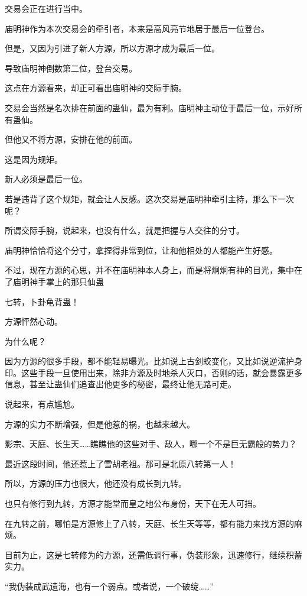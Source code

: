 
\begin{this_body}

交易会正在进行当中。

庙明神作为本次交易会的牵引者，本来是高风亮节地居于最后一位登台。

但是，又因为引进了新人方源，所以方源才成为最后一位。

导致庙明神倒数第二位，登台交易。

这点在方源看来，却正可看出庙明神的交际手腕。

交易会当然是名次排在前面的蛊仙，最为有利。庙明神主动位于最后一位，示好所有蛊仙。

但他又不将方源，安排在他的前面。

这是因为规矩。

新人必须是最后一位。

若是违背了这个规矩，就会让人反感。这次交易是庙明神牵引主持，那么下一次呢？

所谓交际手腕，说起来，也没有什么，就是把握与人交往的分寸。

庙明神恰恰将这个分寸，拿捏得非常到位，让和他相处的人都能产生好感。

不过，现在方源的心思，并不在庙明神本人身上，而是将炯炯有神的目光，集中在了庙明神手掌上的那只仙蛊

七转，卜卦龟背蛊！

方源怦然心动。

为什么呢？

因为方源的很多手段，都不能轻易曝光。比如说上古剑蛟变化，又比如说逆流护身印。这些手段一旦使用出来，除非方源及时地杀人灭口，否则的话，就会暴露更多信息，甚至让蛊仙们追查出他更多的秘密，最终让他无路可走。

说起来，有点尴尬。

方源的实力不断增强，但是他惹的祸，也越来越大。

影宗、天庭、长生天……瞧瞧他的这些对手、敌人，哪一个不是巨无霸般的势力？

最近这段时间，他还惹上了雪胡老祖。那可是北原八转第一人！

所以，方源的压力也很大，他还没有成长到九转。

也只有修行到九转，方源才能堂而皇之地公布身份，天下在无人可挡。

在九转之前，哪怕是方源修上了八转，天庭、长生天等等，都有能力来找方源的麻烦。

目前为止，这是七转修为的方源，还需低调行事，伪装形象，迅速修行，继续积蓄实力。

“我伪装成武遗海，也有一个弱点。或者说，一个破绽……”


\end{this_body}
